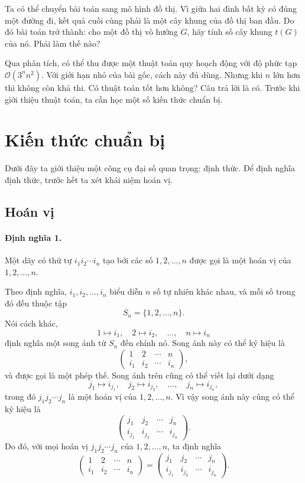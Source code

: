\documentclass[11pt]{article}
\newcommand{\Oh}{\mathcal{O}}
\newcommand{\mat}[1]{\begin{pmatrix}#1\end{pmatrix}}
\begin{document}
Ta có thể chuyển bài toán sang mô hình đồ thị. Vì giữa hai đỉnh bất kỳ có đúng
một đường đi, kết quả cuối cùng phải là một cây khung của đồ thị ban đầu. Do
đó bài toán trở thành: cho một đồ thị vô hướng \(G\), hãy tính số cây khung
\(t(G)\) của nó. Phải làm thế nào?

Qua phân tích, có thể thu được một thuật toán quy hoạch động với độ phức tạp
\(\Oh(3^n n^2)\). Với giới hạn nhỏ của bài gốc, cách này đủ dùng. Nhưng khi
\(n\) lớn hơn thì không còn khả thi. Có thuật toán tốt hơn không? Câu trả lời
là có. Trước khi giới thiệu thuật toán, ta cần học một số kiến thức chuẩn bị.

\section{Kiến thức chuẩn bị}

Dưới đây ta giới thiệu một công cụ đại số quan trọng: định thức. Để định nghĩa
định thức, trước hết ta xét khái niệm hoán vị.

\subsection{Hoán vị}

\paragraph{Định nghĩa 1.}
Một dãy có thứ tự \(i_1i_2\cdots i_n\) tạo bởi các số \(1,2,\ldots,n\) được gọi
là một hoán vị của \(1,2,\ldots,n\).

Theo định nghĩa, \(i_1,i_2,\ldots,i_n\) biểu diễn \(n\) số tự nhiên khác nhau,
và mỗi số trong đó đều thuộc tập
\[
  S_n=\{1,2,\ldots,n\}.
\]
Nói cách khác,
\[
  1\mapsto i_1,\quad 2\mapsto i_2,\quad \ldots,\quad n\mapsto i_n
\]
định nghĩa một song ánh từ \(S_n\) đến chính nó. Song ánh này có thể ký hiệu là
\[
  \mat{1 & 2 & \cdots & n\\ i_1 & i_2 & \cdots & i_n},
\]
và được gọi là một phép thế. Song ánh trên cũng có thể viết lại dưới dạng
\[
  j_1\mapsto i_{j_1},\quad j_2\mapsto i_{j_2},\quad \ldots,\quad
  j_n\mapsto i_{j_n},
\]
trong đó \(j_1j_2\cdots j_n\) là một hoán vị của \(1,2,\ldots,n\). Vì vậy song
ánh này cũng có thể ký hiệu là
\[
  \mat{j_1 & j_2 & \cdots & j_n\\
       i_{j_1} & i_{j_2} & \cdots & i_{j_n}}.
\]
Do đó, với mọi hoán vị \(j_1j_2\cdots j_n\) của \(1,2,\ldots,n\), ta định nghĩa
\[
  \mat{1 & 2 & \cdots & n\\ i_1 & i_2 & \cdots & i_n}
  =
  \mat{j_1 & j_2 & \cdots & j_n\\
       i_{j_1} & i_{j_2} & \cdots & i_{j_n}}.
\]
\end{document}
